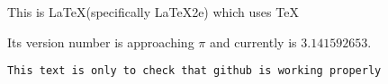 \documentclass{article}
\begin{document}

This is \LaTeX (specifically \LaTeX2e) which uses \TeX

Its version number is approaching $\pi$ and currently is $3.141592653$.

\texttt{This text is only to check that github is working properly}
\end{document}
